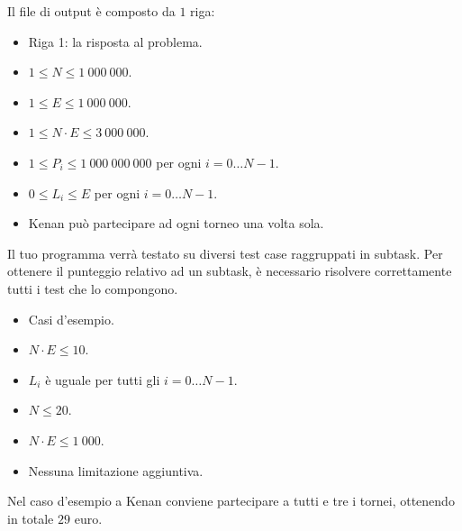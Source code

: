 Il file di output è composto da $1$ riga:
\begin{itemize}
    \item Riga 1: la risposta al problema.
\end{itemize}


\Constraints

\begin{itemize}[nolistsep, itemsep=2mm]
    \item $1 \le N \le 1\:000\:000$.
    \item $1 \le E \le 1\:000\:000$.
    \item $1 \le N \cdot E \le 3\:000\:000$.
    \item $1 \le P_i \le 1\:000\:000\:000$ per ogni $i = 0 \dots N-1$.
    \item $0 \le L_i \le E$ per ogni $i = 0 \dots N-1$.
    \item Kenan può partecipare ad ogni torneo una volta sola.
\end{itemize}


\Scoring

Il tuo programma verrà testato su diversi test case raggruppati in subtask.
Per ottenere il punteggio relativo ad un subtask,
è necessario risolvere correttamente tutti i test che lo compongono.

\begin{itemize}[nolistsep,itemsep=2mm]
    \item \subtask Casi d'esempio.
    \item \subtask $N \cdot E \le 10$.
    \item \subtask $L_i$ è uguale per tutti gli $i = 0 \dots N-1$.
    \item \subtask $N \le 20$.
    \item \subtask $N \cdot E \le 1\:000$.
    \item \subtask Nessuna limitazione aggiuntiva.
\end{itemize}


\Examples

\begin{example}
\end{example}


\Explanation

Nel caso d'esempio a Kenan conviene partecipare a tutti e tre i tornei, ottenendo in totale $29$ euro.
